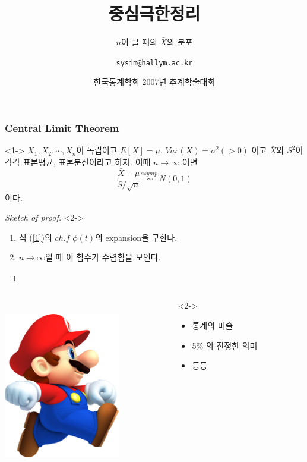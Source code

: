 \documentclass{beamer}
\title{중심극한정리}
\subtitle{$n$이 클 때의 $\bar{X}$의 분포}
\author[심송용]{\texttt{sysim@hallym.ac.kr}}
\date[\today]{한국통계학회 2007년 추계학술대회}
\institute{한림대 통계학과}
\begin{document}

\begin{frame}
\titlepage
\end{frame}

\begin{frame}
\frametitle{Central Limit Theorem}
\begin{theorem}<1->
$X_1, X_2, \cdots, X_n$이 독립이고 $E[X] = \mu$, $Var(X)=\sigma^2 (>0)$ 이고 $\bar{X}$와 $S^2$이 각각 표본평균, 표본분산이라고 하자. 이때 $n \rightarrow \infty$ 이면 
\begin{equation} \label{1}
\frac{\bar{X} - \mu}{S/ \sqrt{n}} \stackrel{asymp.}{\sim}N(0,1)
\end{equation}
이다.
\end{theorem}

\begin{proof}[Sketch of proof]<2->
\begin{enumerate}
\item<3-> 식 (\ref{1})의 $ch.f$ $\phi(t)$의 expansion을 구한다.
\item<4-> $n \rightarrow \infty$일 때 이 함수가 수렴함을 보인다.
\end{enumerate}
\end{proof}
\end{frame}

\begin{frame}
\begin{columns}[T]
\begin{column}{3in}
\centerline{
\includegraphics[width=2in, height=3in]{../images/mari.png}}
\end{column}
\begin{column}{8cm}<2->
\begin{itemize}
\item<1-> 통계의 미술
\item<2-> 5\% 의 진정한 의미
\item<3> 등등
\end{itemize}
\end{column}
\end{columns}
\end{frame}
\end{document}
